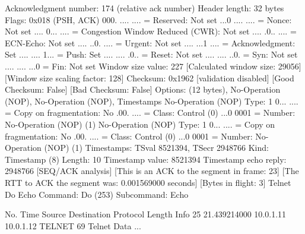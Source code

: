     Acknowledgment number: 174    (relative ack number)
    Header length: 32 bytes
    Flags: 0x018 (PSH, ACK)
        000. .... .... = Reserved: Not set
        ...0 .... .... = Nonce: Not set
        .... 0... .... = Congestion Window Reduced (CWR): Not set
        .... .0.. .... = ECN-Echo: Not set
        .... ..0. .... = Urgent: Not set
        .... ...1 .... = Acknowledgment: Set
        .... .... 1... = Push: Set
        .... .... .0.. = Reset: Not set
        .... .... ..0. = Syn: Not set
        .... .... ...0 = Fin: Not set
    Window size value: 227
    [Calculated window size: 29056]
    [Window size scaling factor: 128]
    Checksum: 0x1962 [validation disabled]
        [Good Checksum: False]
        [Bad Checksum: False]
    Options: (12 bytes), No-Operation (NOP), No-Operation (NOP), Timestamps
        No-Operation (NOP)
            Type: 1
                0... .... = Copy on fragmentation: No
                .00. .... = Class: Control (0)
                ...0 0001 = Number: No-Operation (NOP) (1)
        No-Operation (NOP)
            Type: 1
                0... .... = Copy on fragmentation: No
                .00. .... = Class: Control (0)
                ...0 0001 = Number: No-Operation (NOP) (1)
        Timestamps: TSval 8521394, TSecr 2948766
            Kind: Timestamp (8)
            Length: 10
            Timestamp value: 8521394
            Timestamp echo reply: 2948766
    [SEQ/ACK analysis]
        [This is an ACK to the segment in frame: 23]
        [The RTT to ACK the segment was: 0.001569000 seconds]
        [Bytes in flight: 3]
Telnet
    Do Echo
        Command: Do (253)
        Subcommand: Echo

No.     Time           Source                Destination           Protocol Length Info
     25 21.439214000   10.0.1.11             10.0.1.12             TELNET   69     Telnet Data ...

